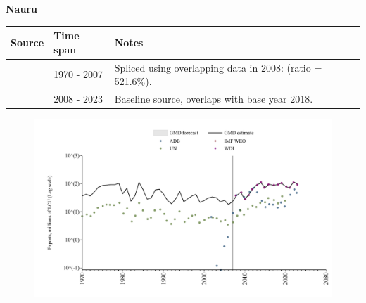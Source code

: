\documentclass[12pt,a4paper,landscape]{article}
\begin{document}
\begin{adjustbox}{max totalsize={\paperwidth}{\paperheight},center}
\begin{minipage}[t][\textheight][t]{\textwidth}
\vspace*{0.5cm}
{}
\begin{center}
{\Large\bfseries Nauru}
\end{center}
\vspace{0.5cm}
\begin{table}[H]
\centering
\small
\begin{tabular}{|l|l|l|}
\hline
\textbf{Source} & \textbf{Time span} & \textbf{Notes} \\
\hline
\rowcolor{white}\cite{UN}& 1970 - 2007 &Spliced using overlapping data in 2008: (ratio = 521.6\%).\\
\rowcolor{lightgray}\cite{WDI}& 2008 - 2023 &Baseline source, overlaps with base year 2018.\\
\hline
\end{tabular}
\end{table}
\begin{figure}[H]
\centering
\includegraphics[width=\textwidth,height=0.6\textheight,keepaspectratio]{graphs/NRU_exports.pdf}
\end{figure}
\end{minipage}
\end{adjustbox}
\end{document}
